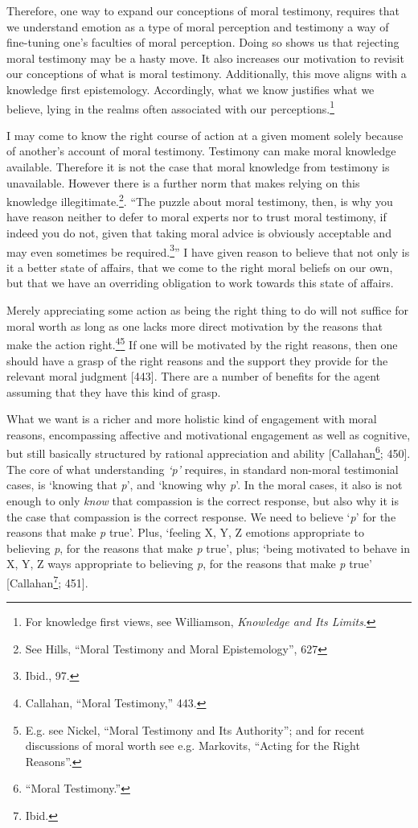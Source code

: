 \documentclass[phdthesis,12pt,final,a4paper]{wuthesis}
\theoremstyle{definition}
\theoremstyle{definition}
\theoremstyle{definition}
\theoremstyle{definition}
\theoremstyle{remark}
\begin{document}
Therefore, one way to expand our conceptions of moral testimony, requires that we understand emotion as a type of moral perception and testimony a way of fine-tuning one's faculties of moral perception. Doing so shows us that rejecting moral testimony may be a hasty move. It also increases our motivation to revisit our conceptions of what is moral testimony. Additionally, this move aligns with a knowledge first epistemology. Accordingly, what we know justifies what we believe, lying in the realms often associated with our perceptions.\footnote{For knowledge first views, see Williamson, \emph{Knowledge and {Its Limits}}.}

I may come to know the right course of action at a given moment solely because of another's account of moral testimony. Testimony can make moral knowledge available. Therefore it is not the case that moral knowledge from testimony is unavailable. However there is a further norm that makes relying on this knowledge illegitimate.\footnote{See Hills, {``Moral Testimony and Moral Epistemology''}, 627}. ``The puzzle about moral testimony, then, is why you have reason neither to defer to moral experts nor to trust moral testimony, if indeed you do not, given that taking moral advice is obviously acceptable and may even sometimes be required.\footnote{Ibid., 97.}'' I have given reason to believe that not only is it a better state of affairs, that we come to the right moral beliefs on our own, but that we have an overriding obligation to work towards this state of affairs.

Merely appreciating some action as being the right thing to do will not suffice for moral worth as long as one lacks more direct motivation by the reasons that make the action right.\footnote{Callahan, {``Moral {Testimony},''} 443.}\footnote{E.g. see Nickel, {``Moral {Testimony} and Its {Authority}''}; and for recent discussions of moral worth see e.g. Markovits, {``Acting for the {Right Reasons}''}.} If one will be motivated by the right reasons, then one should have a grasp of the right reasons and the support they provide for the relevant moral judgment {[}443{]}. There are a number of benefits for the agent assuming that they have this kind of grasp.

What we want is a richer and more holistic kind of engagement with moral reasons, encompassing affective and motivational engagement as well as cognitive, but still basically structured by rational appreciation and ability {[}Callahan\footnote{{``Moral {Testimony}.''}}; 450{]}. The core of what understanding \emph{`p'} requires, in standard non-moral testimonial cases, is `knowing that \emph{p}', and `knowing why \emph{p}'. In the moral cases, it also is not enough to only \emph{know} that compassion is the correct response, but also why it is the case that compassion is the correct response. We need to believe `\emph{p}' for the reasons that make \emph{p} true'. Plus, `feeling X, Y, Z emotions appropriate to believing \emph{p}, for the reasons that make \emph{p} true', plus; `being motivated to behave in X, Y, Z ways appropriate to believing \emph{p}, for the reasons that make \emph{p} true' {[}Callahan\footnote{Ibid.}; 451{]}.
\end{document}
